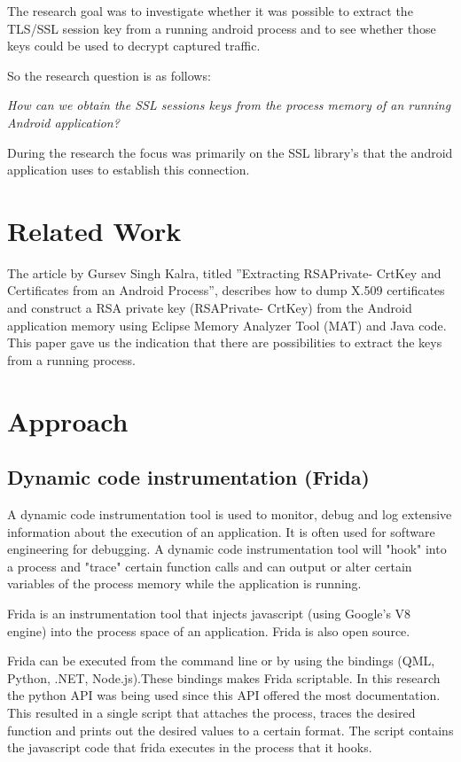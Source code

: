 \documentclass[12pt, a4paper]{report}
\begin{document}
The research goal was to investigate whether it was possible to extract the TLS/SSL session key from a running android process and to see whether those keys could be used to decrypt captured traffic. 

So the research question is as follows:

\begin{framed}
\noindent \textit{How can we obtain the SSL sessions keys from the process memory of an running Android application?}
\end{framed}

During the research the focus was primarily on the SSL library's that the android application uses to establish this connection.

\chapter{Related Work}
The article by Gursev Singh Kalra, titled ”Extracting RSAPrivate-
CrtKey and Certificates from an Android Process”, describes how to
dump X.509 certificates and construct a RSA private key (RSAPrivate-
CrtKey) from the Android application memory using Eclipse Memory
Analyzer Tool (MAT) and Java code. This paper gave us the indication that there are possibilities to extract the keys from a running
process.\cite{ref1}

\chapter{Approach}
\section{Dynamic code instrumentation (Frida)}

A dynamic code instrumentation tool is used to monitor, debug and log extensive information about the execution of an application. It is often used for software engineering for debugging. A dynamic code instrumentation tool will "hook" into a process and "trace" certain function calls and can output or alter certain variables of the process memory while the application is running.

Frida is an instrumentation tool that injects javascript (using Google's V8 engine) into the process space of an application. Frida is also open source.

Frida can be executed from the command line or by using the bindings (QML, Python, .NET, Node.js).These bindings makes Frida scriptable. In this research the python API was being used since this API offered the most documentation. This resulted in a single script that attaches the process, traces the desired function and prints out the desired values to a certain format. The script contains the javascript code that frida executes in the process that it hooks.
\end{document}
